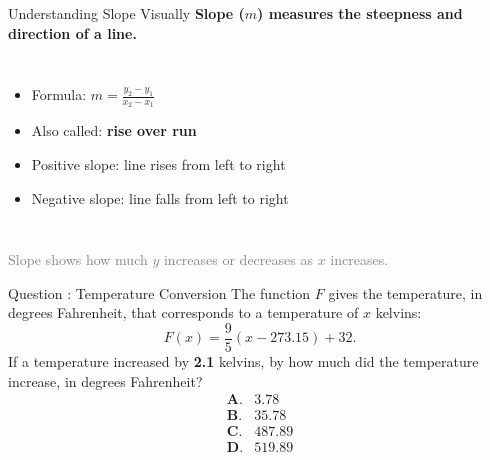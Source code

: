 \documentclass{beamer}
\begin{document}
\begin{frame}{Understanding Slope Visually}
    \textbf{Slope (\(m\)) measures the steepness and direction of a line.}

    \begin{columns}
        \begin{itemize}
            \item Formula: \( m = \frac{y_2 - y_1}{x_2 - x_1} \)
            \item Also called: \textbf{rise over run}
            \item Positive slope: line rises from left to right
            \item Negative slope: line falls from left to right
        \end{itemize}

    \end{columns}

    \vspace{1em}
    \centering
    \textcolor{gray}{Slope shows how much \(y\) increases or decreases as \(x\) increases.}
\end{frame}


\begin{frame}{Question : Temperature Conversion}
    The function \( F \) gives the temperature, in degrees Fahrenheit, that corresponds to a temperature of \( x \) kelvins:
    \[
    F(x) = \frac{9}{5} (x - 273.15) + 32.
    \]
    If a temperature increased by \textbf{2.1} kelvins, by how much did the temperature increase, in degrees Fahrenheit?
    \[
    \begin{array}{ll}
    \textbf{A.} & 3.78 \\
    \textbf{B.} & 35.78 \\
    \textbf{C.} & 487.89 \\
    \textbf{D.} & 519.89
    \end{array}
    \]
\end{frame}
\end{document}
